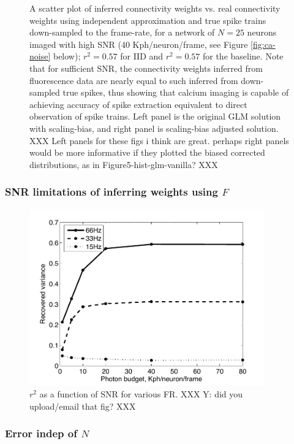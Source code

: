 \begin{figure}[h]
\caption{A scatter plot of inferred connectivity weights vs. real connectivity weights using independent approximation and true spike trains down-sampled to the frame-rate, for a network of $N=25$ neurons imaged with high SNR (40 Kph/neuron/frame, see Figure \ref{fig:ca-noise} below); $r^2=0.57$ for IID and $r^2=0.57$ for the baseline. Note that for sufficient SNR, the connectivity weights inferred from fluorescence data are nearly equal to such inferred from down-sampled true spikes, thus showing that calcium imaging is capable of achieving accuracy of spike extraction equivalent to direct observation of spike trains. Left panel is the original GLM solution with scaling-bias, and right panel is scaling-bias adjusted solution.  XXX Left panels for these figs i think are great.  perhaps right panels would be more informative if they plotted the biased corrected distributions, as in Figure5-hist-glm-vanilla? XXX}
\label{fig:iid-base}
\end{figure}

\clearpage
\subsubsection{SNR limitations of inferring weights using $F$}

\begin{figure}[h]
\centering \includegraphics[width=4in]{../figs/Figure4_r2vsSNR}
\caption{$r^2$ as a function of SNR for various FR. XXX Y: did you upload/email that fig? XXX}
\label{fig:snr}
\end{figure}

\clearpage
\subsubsection{Error indep of $N$}

